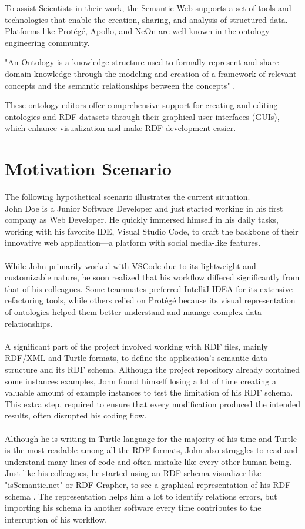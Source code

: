 To assist Scientists in their work, the Semantic Web supports a set of tools and technologies that enable the creation, sharing, and analysis of structured data.
Platforms like Protégé, Apollo, and NeOn are well-known in the ontology engineering community. 

"An Ontology is a knowledge structure used to formally represent and share domain knowledge through the modeling and creation of a framework of relevant concepts and the semantic relationships between the concepts" \cite{ontology}.

These ontology editors offer comprehensive support for creating and editing ontologies and RDF datasets through their graphical user interfaces (GUIs), which enhance visualization and make RDF development easier.

\section{Motivation Scenario\label{sec:moti}}

The following hypothetical scenario illustrates the current situation.
\\
John Doe is a Junior Software Developer and just started working in his first company as Web Developer.
He quickly immersed himself in his daily tasks, working with his favorite IDE, Visual Studio Code, to craft the backbone of their innovative web application—a platform with social media-like features. 
\\
\\
While John primarily worked with VSCode due to its lightweight and customizable nature, he soon realized that his workflow differed significantly from that of his colleagues. Some teammates preferred IntelliJ IDEA for its extensive refactoring tools, while others relied on Protégé because its visual representation of ontologies helped them better understand and manage complex data relationships.
\\
\\
A significant part of the project involved working with RDF files, mainly RDF/XML and Turtle formats, to define the application's semantic data structure and its RDF schema. Although the project repository already contained some instances examples, John found himself losing a lot of time creating a valuable amount of example instances to test the limitation of his RDF schema. This extra step, required to ensure that every modification produced the intended results, often disrupted his coding flow.
\\
\\
Although he is writing in Turtle language for the majority of his time and Turtle is the most readable among all the RDF formats, John also struggles to read and understand many lines of code and often mistake like every other human being. Just like his colleagues, he started using an RDF schema visualizer like "isSemantic.net" or RDF Grapher, to see a graphical representation of his RDF schema \cite{issemantic,rdfGrapher}. The representation helps him a lot to identify relations errors, but importing his schema in another software every time contributes to the interruption of his workflow.


